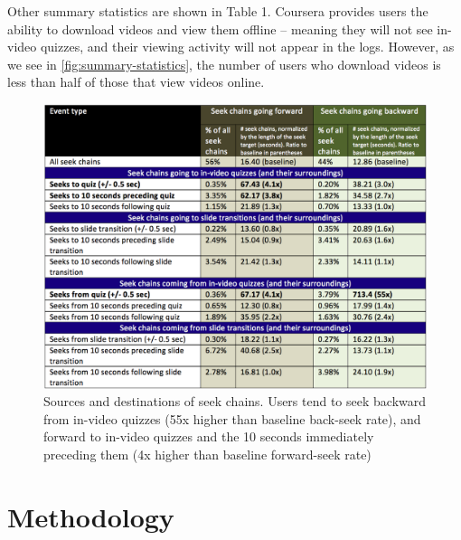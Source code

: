 \documentclass{sigchi}
\begin{document}
Other summary statistics are shown in Table 1. Coursera provides users the ability to download videos and view them offline -- meaning they will not see in-video quizzes, and their viewing activity will not appear in the logs. However, as we see in \autoref{fig:summary-statistics}, the number of users who download videos is less than half of those that view videos online. 


\begin{figure}
\includegraphics[width=1.0\columnwidth]{seek-sources-and-destinations-table}
\caption{Sources and destinations of seek chains. Users tend to seek backward from in-video quizzes (55x higher than baseline back-seek rate), and forward to in-video quizzes and the 10 seconds immediately preceding them (4x higher than baseline forward-seek rate)}
\label{fig:seek-sources-and-destinations-table}
\end{figure}

\section{Methodology}
\end{document}
